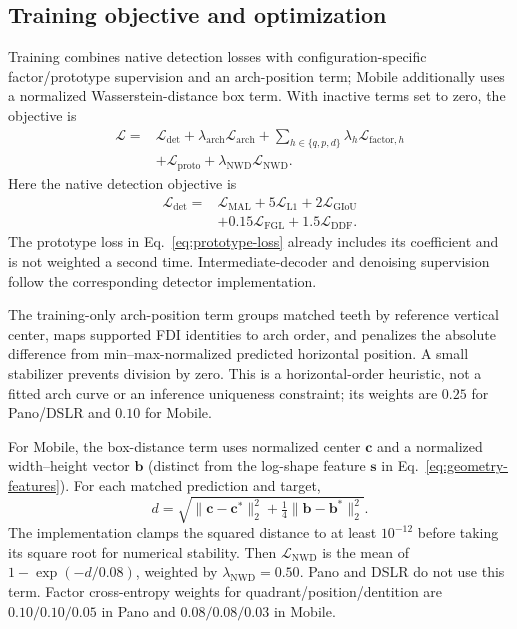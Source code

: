 \documentclass[a4paper,fleqn]{cas-dc}
\begin{document}
\subsection{Training objective and optimization}
\label{sec:objective}

Training combines native detection losses with configuration-specific factor/prototype supervision and an arch-position term; Mobile additionally uses a normalized Wasserstein-distance box term. With inactive terms set to zero, the objective is
\begin{equation}
 \begin{aligned}
 \mathcal L={}&\mathcal L_{\mathrm{det}}
  +\lambda_{\mathrm{arch}}\mathcal L_{\mathrm{arch}}
  +\sum_{h\in\{q,p,d\}}\lambda_h\mathcal L_{\mathrm{factor},h}\\
 &+\mathcal L_{\mathrm{proto}}
  +\lambda_{\mathrm{NWD}}\mathcal L_{\mathrm{NWD}}.
 \end{aligned}
 \label{eq:total-loss}
\end{equation}
Here the native detection objective is
\[
 \begin{aligned}
 \mathcal L_{\mathrm{det}}={}&\mathcal L_{\mathrm{MAL}}
  +5\mathcal L_{\mathrm{L1}}+2\mathcal L_{\mathrm{GIoU}}\\
 &+0.15\mathcal L_{\mathrm{FGL}}+1.5\mathcal L_{\mathrm{DDF}}.
 \end{aligned}
\]
The prototype loss in Eq.~\eqref{eq:prototype-loss} already includes its coefficient and is not weighted a second time. Intermediate-decoder and denoising supervision follow the corresponding detector implementation.

The training-only arch-position term groups matched teeth by reference vertical center, maps supported FDI identities to arch order, and penalizes the absolute difference from min--max-normalized predicted horizontal position. A small stabilizer prevents division by zero. This is a horizontal-order heuristic, not a fitted arch curve or an inference uniqueness constraint; its weights are $0.25$ for Pano/DSLR and $0.10$ for Mobile.

For Mobile, the box-distance term uses normalized center $\mathbf c$ and a normalized width--height vector $\mathbf b$ (distinct from the log-shape feature $\mathbf s$ in Eq.~\eqref{eq:geometry-features}). For each matched prediction and target,
\[
 d=\sqrt{\lVert\mathbf c-\mathbf c^*\rVert_2^2
       +\tfrac14\lVert\mathbf b-\mathbf b^*\rVert_2^2}.
\]
The implementation clamps the squared distance to at least $10^{-12}$ before taking its square root for numerical stability. Then $\mathcal L_{\mathrm{NWD}}$ is the mean of $1-\exp(-d/0.08)$, weighted by $\lambda_{\mathrm{NWD}}=0.50$. Pano and DSLR do not use this term. Factor cross-entropy weights for quadrant/position/dentition are $0.10/0.10/0.05$ in Pano and $0.08/0.08/0.03$ in Mobile.
\end{document}
